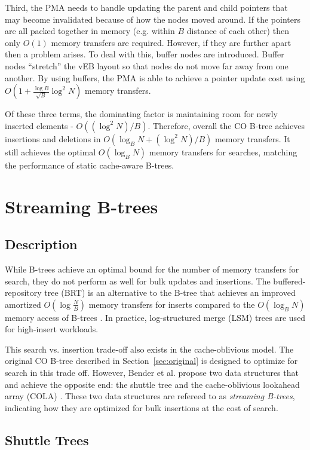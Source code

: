 \documentclass[preprint]{style}
\begin{document}
Third, the PMA needs to handle updating the parent and child pointers that may
become invalidated because of how the nodes moved around. If the pointers are
all packed together in memory (e.g. within $B$ distance of each other) then
only $O(1)$ memory transfers are required. However, if they are further apart
then a problem arises. To deal with this, buffer nodes are introduced.  Buffer
nodes ``stretch'' the vEB layout so that nodes do not move far away from one
another. By using buffers, the PMA is able to achieve a pointer update cost
using $O(1+ \frac{\log{B}}{\sqrt{B}}\log^2{N})$ memory transfers.

Of these three terms, the dominating factor is maintaining room for newly
inserted elements - $O((\log^2{N})/B)$. Therefore, overall the CO B-tree
achieves insertions and deletions in $O(\log_B{N} + (\log^2{N})/B)$ memory
transfers. It still achieves the optimal $O(\log_B{N})$ memory transfers for
searches, matching the performance of static cache-aware B-trees.

\section{Streaming B-trees}

\subsection{Description}

While B-trees achieve an optimal bound for the number of memory transfers for
search, they do not perform as well for bulk updates and insertions. The
buffered-repository tree (BRT) is an alternative to the B-tree that achieves an
improved amortized $O(\log{\frac{N}{B}})$ memory transfers for inserts compared
to the $O(\log_{B}{N})$ memory access of B-trees \cite{Buchsbaum}. In practice, log-structured
merge (LSM) trees \cite{ONeil96} are used for high-insert workloads.

This search vs. insertion trade-off also exists in the cache-oblivious model.
The original CO B-tree described in Section~\ref{sec:original} is designed to
optimize for search in this trade off. However, Bender et al. propose two data
structures that and achieve the opposite end: the shuttle tree and the
cache-oblivious lookahead array (COLA) \cite{BenderFaFi07}. These two data
structures are refereed to as \textit{streaming B-trees}, indicating how they
are optimized for bulk insertions at the cost of search.

\subsection{Shuttle Trees}
\end{document}

